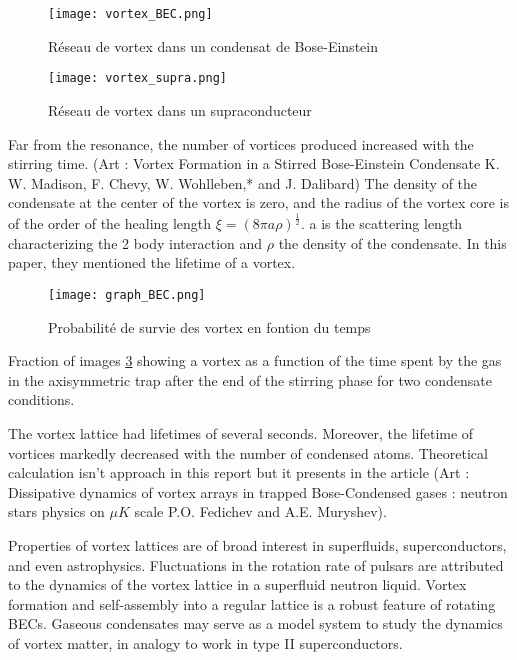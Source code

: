 \documentclass[a4paper]{article}
\begin{document}
\begin{multicols}{2}
\begin{figure}[H]
 \centering
 \texttt{[image: vortex\_BEC.png]}
 \caption{\label{fig1:v_BEC}Réseau de vortex dans un condensat de Bose-Einstein}
\end{figure}


\begin{figure}[H]
 \centering
 \texttt{[image: vortex\_supra.png]}
 \caption{\label{fig2:v_supra}Réseau de vortex dans un supraconducteur}
\end{figure}


Far from the resonance, the number of vortices produced increased with the stirring time. (Art : Vortex Formation in a Stirred Bose-Einstein Condensate K. W. Madison, F. Chevy, W. Wohlleben,* and J. Dalibard) The density of the condensate at the center of the vortex is zero, and the radius of the vortex core is of the order of the healing length $\xi = (8\pi a\rho)^{\frac{1}{2}}$.
 a is the scattering length characterizing the 2 body interaction and $\rho$ the density of the condensate. In this paper, they mentioned the lifetime of a vortex.


\begin{figure}[H]
 \centering
 \texttt{[image: graph\_BEC.png]}
 \caption{\label{fig3:graph_BEC}Probabilité de survie des vortex en fontion du temps}
\end{figure}

Fraction of images \ref{fig3:graph_BEC} showing a vortex as a function of the time spent by the gas in the axisymmetric trap after the end of the stirring phase for two condensate conditions.

 The vortex lattice had lifetimes of several seconds. Moreover, the lifetime of vortices markedly decreased with the number of condensed atoms. Theoretical calculation isn’t approach in this report but it presents in the article (Art : Dissipative dynamics of vortex arrays in trapped Bose-Condensed gases : neutron stars physics on $\mu K$ scale P.O. Fedichev and A.E. Muryshev).

Properties of vortex lattices are of broad interest in superfluids, superconductors, and even astrophysics. Fluctuations in the rotation rate of pulsars are attributed to the dynamics of the vortex lattice in a superfluid neutron liquid. Vortex formation and self-assembly into a regular lattice is a robust feature of rotating BECs. Gaseous condensates may serve as a model system to study the dynamics of vortex matter, in analogy to work in type II superconductors.




\end{multicols}
\end{document}
